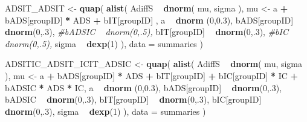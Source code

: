 \documentclass[10pt,dvipsnames,enabledeprecatedfontcommands]{scrartcl}
\newenvironment{Shaded}{\begin{snugshade}}{\end{snugshade}}
\newcommand{\KeywordTok}[1]{\textcolor[rgb]{0.13,0.29,0.53}{\textbf{#1}}}
\newcommand{\DataTypeTok}[1]{\textcolor[rgb]{0.13,0.29,0.53}{#1}}
\newcommand{\DecValTok}[1]{\textcolor[rgb]{0.00,0.00,0.81}{#1}}
\newcommand{\FloatTok}[1]{\textcolor[rgb]{0.00,0.00,0.81}{#1}}
\newcommand{\StringTok}[1]{\textcolor[rgb]{0.31,0.60,0.02}{#1}}
\newcommand{\CommentTok}[1]{\textcolor[rgb]{0.56,0.35,0.01}{\textit{#1}}}
\newcommand{\OperatorTok}[1]{\textcolor[rgb]{0.81,0.36,0.00}{\textbf{#1}}}
\newcommand{\NormalTok}[1]{#1}
\begin{document}
\begin{Shaded}
\begin{Highlighting}[]
\NormalTok{ADSIT_ADSIT <-}\StringTok{ }\KeywordTok{quap}\NormalTok{(}
  \KeywordTok{alist}\NormalTok{(}
\NormalTok{    AdiffS }\OperatorTok{~}\StringTok{ }\KeywordTok{dnorm}\NormalTok{( mu, sigma ),}
\NormalTok{    mu <-}\StringTok{ }\NormalTok{a }\OperatorTok{+}\StringTok{ }\NormalTok{bADS[groupID] }\OperatorTok{*}\StringTok{ }\NormalTok{ADS }\OperatorTok{+}\StringTok{  }\NormalTok{bIT[groupID] ,}
\NormalTok{    a }\OperatorTok{~}\StringTok{ }\KeywordTok{dnorm}\NormalTok{ (}\DecValTok{0}\NormalTok{,}\FloatTok{0.3}\NormalTok{),}
\NormalTok{    bADS[groupID] }\OperatorTok{~}\StringTok{ }\KeywordTok{dnorm}\NormalTok{(}\DecValTok{0}\NormalTok{,.}\DecValTok{3}\NormalTok{),}
    \CommentTok{#bADSIC ~ dnorm(0,.5),}
\NormalTok{    bIT[groupID] }\OperatorTok{~}\StringTok{ }\KeywordTok{dnorm}\NormalTok{(}\DecValTok{0}\NormalTok{,.}\DecValTok{3}\NormalTok{),}
    \CommentTok{#bIC ~ dnorm(0,.5),}
\NormalTok{    sigma  }\OperatorTok{~}\StringTok{ }\KeywordTok{dexp}\NormalTok{(}\DecValTok{1}\NormalTok{)}
\NormalTok{  ), }
  \DataTypeTok{data =}\NormalTok{ summaries}
\NormalTok{)}


\NormalTok{ADSITIC_ADSIT_ICIT_ADSIC <-}\StringTok{ }\KeywordTok{quap}\NormalTok{(}
  \KeywordTok{alist}\NormalTok{(}
\NormalTok{    AdiffS }\OperatorTok{~}\StringTok{ }\KeywordTok{dnorm}\NormalTok{( mu, sigma ),}
\NormalTok{    mu <-}\StringTok{ }\NormalTok{a }\OperatorTok{+}\StringTok{ }\NormalTok{bADS[groupID] }\OperatorTok{*}\StringTok{ }\NormalTok{ADS }\OperatorTok{+}\StringTok{  }\NormalTok{bIT[groupID] }\OperatorTok{+}\StringTok{ }\NormalTok{bIC[groupID] }\OperatorTok{*}\StringTok{ }\NormalTok{IC }\OperatorTok{+}
\StringTok{      }\NormalTok{bADSIC }\OperatorTok{*}\StringTok{ }\NormalTok{ADS }\OperatorTok{*}\StringTok{ }\NormalTok{IC,}
\NormalTok{    a }\OperatorTok{~}\StringTok{ }\KeywordTok{dnorm}\NormalTok{ (}\DecValTok{0}\NormalTok{,}\FloatTok{0.3}\NormalTok{),}
\NormalTok{    bADS[groupID] }\OperatorTok{~}\StringTok{ }\KeywordTok{dnorm}\NormalTok{(}\DecValTok{0}\NormalTok{,.}\DecValTok{3}\NormalTok{),}
\NormalTok{    bADSIC }\OperatorTok{~}\StringTok{ }\KeywordTok{dnorm}\NormalTok{(}\DecValTok{0}\NormalTok{,.}\DecValTok{3}\NormalTok{),}
\NormalTok{    bIT[groupID] }\OperatorTok{~}\StringTok{ }\KeywordTok{dnorm}\NormalTok{(}\DecValTok{0}\NormalTok{,.}\DecValTok{3}\NormalTok{),}
\NormalTok{    bIC[groupID] }\OperatorTok{~}\StringTok{ }\KeywordTok{dnorm}\NormalTok{(}\DecValTok{0}\NormalTok{,.}\DecValTok{3}\NormalTok{),}
\NormalTok{    sigma  }\OperatorTok{~}\StringTok{ }\KeywordTok{dexp}\NormalTok{(}\DecValTok{1}\NormalTok{)}
\NormalTok{  ), }
  \DataTypeTok{data =}\NormalTok{ summaries}
\NormalTok{)}



\end{Highlighting}
\end{Shaded}
\end{document}
